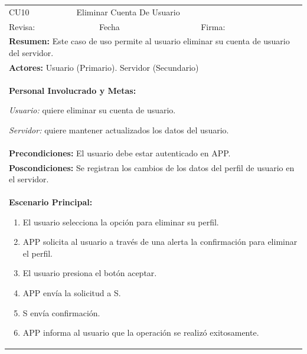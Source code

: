 \begin{longtable}{|l|p{5.5cm}|l|p{2cm}|l|p{1.9cm}|} \hline
    \cellcolor{grisOscuro} CU10 & \multicolumn{4}{|l|}{  \cellcolor{grisOscuro} Eliminar Cuenta De Usuario} &  \cellcolor{grisClaro}\multirow{2}{1cm}{} \\ \cline{1-5}
    \cellcolor{grisOscuro} Revisa: &  \cellcolor{grisClaro} &  \cellcolor{grisOscuro} Fecha &  \cellcolor{grisClaro} &  \cellcolor{grisOscuro} Firma: & \cellcolor{grisClaro} \\ \hline
    \multicolumn{6}{|p{15cm}|}{ \textbf{Resumen: } Este caso de uso permite al usuario eliminar su cuenta de usuario del servidor.

    } \\ \hline

    \multicolumn{6}{|p{15cm}|}{ \textbf{Actores: } Usuario (Primario). Servidor (Secundario)

    } \\ \hline

    \multicolumn{6}{|p{15cm}|}{ \textbf{Personal Involucrado y Metas: }
    
    \emph{Usuario:} quiere eliminar su cuenta de usuario.

    \emph{Servidor:} quiere mantener actualizados los datos del usuario.

    } \\ \hline

    \multicolumn{6}{|p{15cm}|}{ \textbf{Precondiciones: } El usuario debe estar autenticado en APP.

    } \\ \hline

    \multicolumn{6}{|p{15cm}|}{ \textbf{Poscondiciones: } Se registran los cambios de los datos del perfil de usuario en el servidor.

    } \\ \hline

    \multicolumn{6}{|p{15cm}|}{ \textbf{Escenario Principal: }

    \begin{enumerate}
        \item El usuario selecciona la opción para eliminar su perfil.
        \item APP solicita al usuario a través de una alerta la confirmación para eliminar el perfil.
        \item El usuario presiona el botón aceptar.
        \item APP envía la solicitud a S.
        \item S envía confirmación.
        \item APP informa al usuario que la operación se realizó exitosamente.
    \end{enumerate}

}
\end{longtable}
